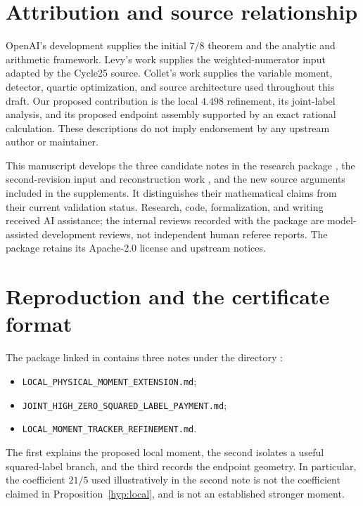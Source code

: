 \documentclass[11pt]{article}
\theoremstyle{definition}
\newcommand{\code}[1]{\texttt{\small #1}}
\begin{document}
\section{Attribution and source relationship}\label{sec:credits}

OpenAI's development supplies the initial $7/8$ theorem and the analytic
and arithmetic framework. Levy's work supplies the weighted-numerator
input adapted by the Cycle25 source. Collet's work supplies the variable
moment, detector, quartic optimization, and source architecture used
throughout this draft. Our proposed contribution is the local
$4.498$ refinement, its joint-label analysis, and its proposed endpoint
assembly supported by an exact rational calculation. These descriptions do not imply endorsement by
any upstream author or maintainer.

This manuscript develops the three candidate notes in the research
package \cite{gao}, the second-revision input and reconstruction work
\cite{gaov2}, and the new source arguments included in the supplements.
It distinguishes their mathematical claims from their current validation
status. Research,
code, formalization, and writing received AI assistance; the internal
reviews recorded with the package are model-assisted development
reviews, not independent human referee reports. The package retains its
Apache-2.0 license and upstream notices.

\appendix
\section{Reproduction and the certificate format}\label{app:reproduce}

The package linked in \cite{gao} contains three notes under the directory
:
\begin{itemize}
\item \code{LOCAL\_PHYSICAL\_MOMENT\_EXTENSION.md};
\item \code{JOINT\_HIGH\_ZERO\_SQUARED\_LABEL\_PAYMENT.md};
\item \code{LOCAL\_MOMENT\_TRACKER\_REFINEMENT.md}.
\end{itemize}
The first explains the proposed local moment, the second isolates a
useful squared-label branch, and the third records the endpoint
geometry. In particular, the coefficient $21/5$ used illustratively in
the second note is not the coefficient claimed in
Proposition~\ref{hyp:local}, and is not an established stronger moment.
\end{document}
